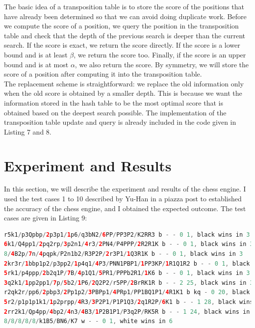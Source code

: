 \documentclass[9.5pt]{extarticle}
\begin{document}
The basic idea of a transposition table is to store the score of the positions that have already been determined so that we can avoid doing duplicate work. Before we compute the score of a position, we query the position in the transposition table and check that the depth of the previous search is deeper than the current search. If the score is exact, we return the score directly. If the score is a lower bound and is at least $\beta$, we return the score too. Finally, if the score is an upper bound and is at most $\alpha$, we also return the score. By symmetry, we will store the score of a position after computing it into the transposition table. \\

The replacement scheme is straightforward: we replace the old information only when the old score is obtained by a smaller depth. This is because we want the information stored in the hash table to be the most optimal score that is obtained based on the deepest search possible. The implementation of the transposition table update and query is already included in the code given in Listing 7 and 8.

\section{Experiment and Results}

In this section, we will describe the experiment and results of the chess engine. I used the test cases 1 to 10 described by Yu-Han in a piazza post to established the accuracy of the chess engine, and I obtained the expected outcome. The test cases are given in Listing 9:

\begin{lstlisting}[language=java,caption={Test cases used in experiments and experimental outcome agrees with expected outcome}]
r5k1/p3Qpbp/2p3p1/1p6/q3bN2/6PP/PP3P2/K2RR3 b - - 0 1, black wins in 3
6k1/Q4pp1/2pq2rp/3p2n1/4r3/2PN4/P4PPP/2R2R1K b - - 0 1, black wins in 3
8/4B2p/7n/4pqpk/P2n1b2/R3P2P/2r3P1/1Q3R1K b - - 0 1, black wins in 3
2kr3r/1bbp1p2/p3pp2/1p4q1/4P3/PNN1PBP1/1PP3KP/1R1Q1R2 b - - 0 1, black wins in 3
5rk1/p4ppp/2b2q1P/7B/4p1Q1/5PR1/PPPb2R1/1K6 b - - 0 1, black wins in 3
3q2k1/1pp2pp1/7p/5b2/1P6/2Q2P2/r5PP/2BrRK1R b - - 2 25, black wins in 3
r2qk2r/pp6/2pbp3/2Pp1p2/3PBPp1/4PRp1/PP1BQ1P1/4R1K1 b kq - 0 20, black wins in 4
5r2/p1p1p1k1/1p2prpp/4R3/3P2P1/P1P1Q3/2q1R2P/6K1 b - - 1 28, black wins in 5
2rr2k1/Qp4pp/4bp2/4n3/4B3/1P2B1P1/P3q2P/RK5R b - - 1 24, black wins in 5
8/8/8/8/8/k1B5/BN6/K7 w - - 0 1, white wins in 6
\end{lstlisting}
\end{document}
